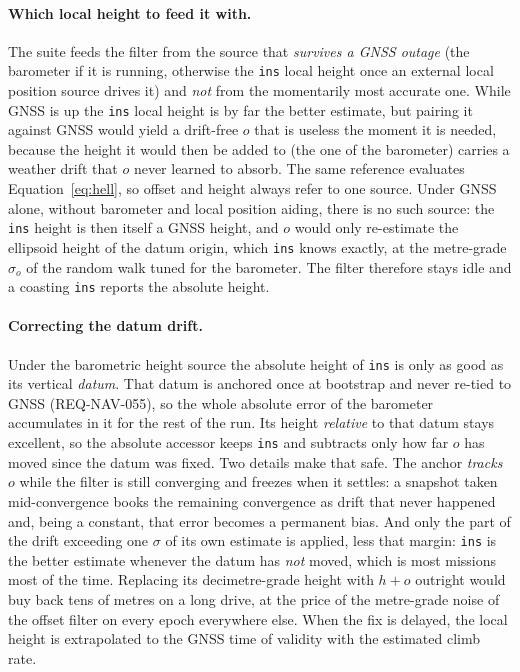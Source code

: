 \documentclass[11pt,a4paper]{article}
\newcommand{\code}[1]{\texttt{#1}}
\begin{document}
\paragraph{Which local height to feed it with.} The suite feeds the filter from
the source that \emph{survives a GNSS outage} (the barometer if it is running,
otherwise the \code{ins} local height once an external local position source
drives it) and \emph{not} from the momentarily
most accurate one. While GNSS is up the \code{ins} local height is by far the
better estimate, but pairing it against GNSS would yield a drift-free $o$ that
is useless the moment it is needed, because the height it would then be added to
(the one of the barometer) carries a weather drift that $o$ never learned to
absorb. The same reference evaluates Equation~\eqref{eq:hell}, so offset and
height always refer to one source. Under GNSS alone, without barometer and
local position aiding, there is no such source: the \code{ins} height is then
itself a GNSS height, and $o$ would only re-estimate the ellipsoid height of
the datum origin, which \code{ins} knows exactly, at the metre-grade
$\sigma_o$ of the random walk tuned for the barometer. The filter therefore
stays idle and a coasting \code{ins} reports the absolute height.

\paragraph{Correcting the datum drift.} Under the barometric height source the
absolute height of \code{ins} is only as good as its vertical \emph{datum}. That
datum is anchored once at bootstrap and never re-tied to GNSS
(REQ-NAV-055), so the whole absolute error of the barometer accumulates in it for
the rest of the run. Its height \emph{relative} to that datum stays excellent, so
the absolute accessor keeps \code{ins} and subtracts only how far $o$ has moved
since the datum was fixed. Two details make that safe. The anchor \emph{tracks}
$o$ while the filter is still converging and freezes when it settles: a
snapshot taken mid-convergence books the remaining convergence as drift that
never happened and, being a constant, that error becomes a permanent bias. And
only the part of the drift exceeding one $\sigma$ of its own estimate is
applied, less that margin: \code{ins} is the better estimate whenever the datum
has \emph{not} moved, which is most missions most of the time. Replacing its
decimetre-grade height with $h + o$ outright would buy back tens of metres on a
long drive, at the price of the metre-grade noise of the offset filter on every
epoch everywhere else. When the fix is delayed, the local height is extrapolated
to the GNSS time of validity with the estimated climb rate.
\end{document}

